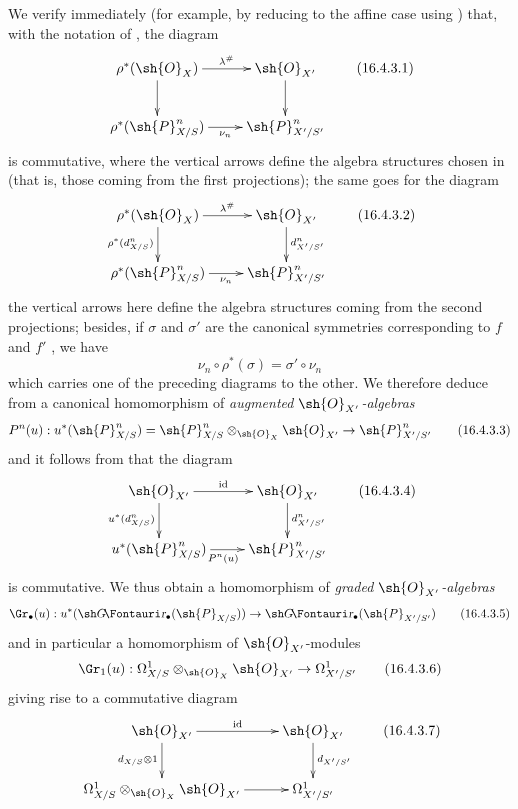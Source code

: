 \begin{env}[16.4.3]
\label{IV.16.4.3}
We verify immediately (for example, by reducing to the affine case using ) that, with the notation of , the diagram
\[
  \label{IV.16.4.3.1}
  \xymatrix{
    \rho^*(\sh{O}_X) \ar[r]^-{\lambda^\#} \ar[d] & \sh{O}_{X'} \ar[d] \\
    \rho^*(\sh{P}_{X/S}^n) \ar[r]_-{\nu_n} & \sh{P}_{X'/S'}^n  
  }
  \tag{16.4.3.1}
\]
is commutative, where the vertical arrows define the algebra structures chosen in  (that is, those coming from the first projections);
the same goes for the diagram
\[
  \label{IV.16.4.3.2}
  \xymatrix{
    \rho^*(\sh{O}_X) \ar[r]^-{\lambda^\#} \ar[d]_-{\rho^*(d_{X/S}^n)} & \sh{O}_{X'} \ar[d]^-{d_{X'/S'}^n} \\
    \rho^*(\sh{P}_{X/S}^n) \ar[r]_-{\nu_n} & \sh{P}_{X'/S'}^n  
  }
  \tag{16.4.3.2}
\]
the vertical arrows here define the algebra structures coming from the second projections;
besides, if $\sigma$ and $\sigma'$ are the canonical symmetries corresponding to $f$ and $f'$ , we have
\[
  \nu_n \circ \rho^*(\sigma) = \sigma' \circ \nu_n 
\] 
which carries one of the preceding diagrams to the other.
We therefore deduce from  a canonical homomorphism of \emph{augmented $\sh{O}_{X'}$-algebras}
\[
  \label{IV.16.4.3.3}
  P^n(u): u^*(\sh{P}_{X/S}^n) = \sh{P}_{X/S}^n \otimes_{\sh{O}_X} \sh{O}_{X'} \to \sh{P}_{X'/S'}^n 
  \tag{16.4.3.3}
\]
and it follows from  that the diagram 
\[
  \label{IV.16.4.3.4}
  \xymatrix{
    \sh{O}_{X'} \ar[r]^-{\operatorname{id}} \ar[d]_-{u^*(d_{X/S}^n)}  & \sh{O}_{X'} \ar[d]^-{d_{X'/S'}^n} \\
    u^*(\sh{P}_{X/S}^n) \ar[r]_{P^n(u)} & \sh{P}_{X'/S'}^n
  }
  \tag{16.4.3.4}
\]
is commutative.
We thus obtain a homomorphism of \emph{graded $\sh{O}_{X'}$-algebras}
\[
  \label{IV.16.4.3.5}
  \Gr_\bullet(u):u^*(\shGr_\bullet(\sh{P}_{X/S})) \to \shGr_\bullet(\sh{P}_{X'/S'})
  \tag{16.4.3.5}
\]
and in particular a homomorphism of $\sh{O}_{X'}$-modules 
\[
  \label{IV.16.4.3.6}
  \Gr_1(u):\Omega_{X/S}^1 \otimes_{\sh{O}_X} \sh{O}_{X'} \to \Omega_{X'/S'}^1
  \tag{16.4.3.6}
\]
giving rise to a commutative diagram
\[
  \label{IV.16.4.3.7}
  \xymatrix{
    \sh{O}_{X'} \ar[r]^-{\operatorname{id}} \ar[d]_-{d_{X/S} \otimes 1}  & \sh{O}_{X'} \ar[d]^-{d_{X'/S'}} \\
    \Omega_{X/S}^1 \otimes_{\sh{O}_X} \sh{O}_{X'} \ar[r] & \Omega_{X'/S'}^1
  }
  \tag{16.4.3.7}
\]
\end{env}

